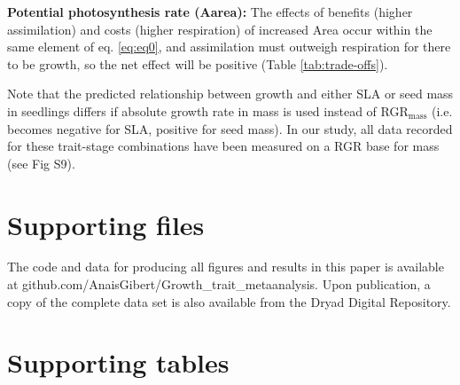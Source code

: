 \documentclass[a4paper,11pt]{article}
\begin{document}
\begin{appendices}
\textbf{Potential photosynthesis rate (Aarea):} The effects of benefits (higher assimilation) and costs (higher respiration) of increased Area occur within the same element of eq. \ref{eq:eq0}, and assimilation must outweigh respiration for there to be growth, so the net effect will be positive (Table \ref{tab:trade-offs}).

Note that the predicted relationship between growth and either SLA or seed mass in seedlings differs if absolute growth rate in mass is used instead of RGR$_\textrm{mass}$ (i.e. becomes negative for SLA, positive for seed mass). In our study, all data recorded for these trait-stage combinations have been measured on a RGR base for mass (see Fig S9).


\clearpage

\section{Supporting files}\label{app:supp_info_files}

The code and data for producing all figures and results in this paper is available at github.com/AnaisGibert/Growth\_trait\_metaanalysis.  Upon publication, a copy of the complete data set is also available from the Dryad Digital Repository.

\section{Supporting tables}\label{app:supp_info_tables}

\linespread{1}


\end{appendices}
\end{document}
